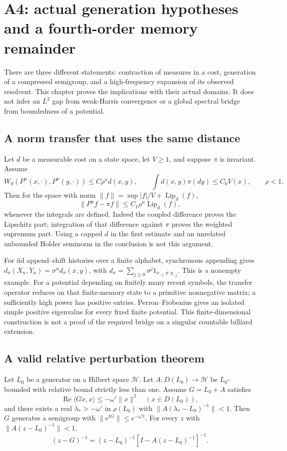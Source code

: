 \section{A4: actual generation hypotheses and a fourth-order memory remainder}
\label{sec:r33-a4}

There are three different statements: contraction of measures in a cost, generation of a compressed semigroup, and a high-frequency expansion of its observed resolvent. This chapter proves the implications with their actual domains. It does not infer an $L^2$ gap from weak-Harris convergence or a global spectral bridge from boundedness of a potential.

\subsection{A norm transfer that uses the same distance}
Let $d$ be a measurable cost on a state space, let $V\ge1$, and suppose $\pi$ is invariant. Assume
\[
 W_d(P^n(x,\cdot),P^n(y,\cdot))\le C\rho^n d(x,y),\qquad
 \int d(x,y)\pi(dy)\le C_0V(x),\qquad \rho<1.
\]
Then for the space with norm $\|f\|=\sup|f|/V+\operatorname{Lip}_d(f)$,
\[
 \|P^nf-\pi f\|\le C_1\rho^n\operatorname{Lip}_d(f),
\]
whenever the integrals are defined. Indeed the coupled difference proves the Lipschitz part; integration of that difference against $\pi$ proves the weighted supremum part. Using a capped $d$ in the first estimate and an unrelated unbounded Holder seminorm in the conclusion is not this argument.

For iid append--shift histories over a finite alphabet, synchronous appending gives $d_\sigma(X_n,Y_n)=\sigma^nd_\sigma(x,y)$, with $d_\sigma=\sum_{j\ge0}\sigma^j1_{x_{-j}\ne y_{-j}}$. This is a nonempty example. For a potential depending on finitely many recent symbols, the transfer operator reduces on that finite-memory state to a primitive nonnegative matrix; a sufficiently high power has positive entries. Perron--Frobenius gives an isolated simple positive eigenvalue for every fixed finite potential. This finite-dimensional construction is not a proof of the required bridge on a singular countable billiard extension.

\subsection{A valid relative perturbation theorem}
\begin{theorem}
\label{thm:r33-a4-generation}
Let $L_0$ be a generator on a Hilbert space $\mathcal H$. Let $A:D(L_0)\to\mathcal H$ be $L_0$-bounded with relative bound strictly less than one. Assume $G=L_0+A$ satisfies
\[
 \operatorname{Re}\langle Gx,x\rangle\le-\omega'\|x\|^2
 \quad(x\in D(L_0)),
\]
and there exists a real $\lambda_*>-\omega'$ in $\rho(L_0)$ with
$\|A(\lambda_*-L_0)^{-1}\|<1$.
Then $G$ generates a semigroup with $\|e^{tG}\|\le e^{-\omega't}$. For every $z$ with $\|A(z-L_0)^{-1}\|<1$,
\[
 (z-G)^{-1}=(z-L_0)^{-1}[I-A(z-L_0)^{-1}]^{-1}.
\]
\end{theorem}

